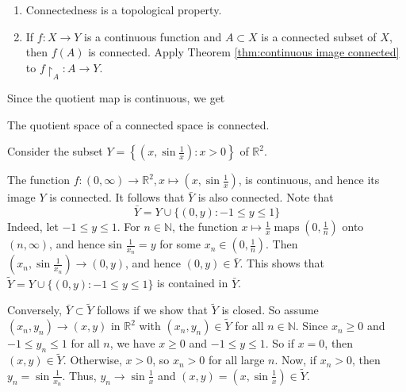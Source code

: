 \documentclass[a4paper,11pt]{article}
\begin{document}
\begin{remark}
    \begin{enumerate}
        \item Connectedness is a topological property.
      
        \item If $f: X \rightarrow Y$ is a continuous function and $A \subset X$ is a connected subset of $X$, then $f(A)$ is connected. Apply Theorem \ref{thm:continuous image connected} to $f\restriction_{A}: A \rightarrow Y$.
      \end{enumerate}
\end{remark}

Since the quotient map is continuous, we get
\begin{corollary}
    The quotient space of a connected space is connected.
\end{corollary}

\begin{example}
    Consider the subset $Y=\left\{\left(x, \sin \frac{1}{x}\right): x>0\right\}$ of $\mathbb{R}^{2}$. 
    
    The function $f:(0, \infty) \rightarrow \mathbb{R}^{2}, x \mapsto\left(x, \sin \frac{1}{x}\right)$, is continuous, and hence its image $Y$ is connected. It follows that $\bar{Y}$ is also connected. Note that
    $$
    \bar{Y}=Y \cup\{(0, y):-1 \leqslant y \leqslant 1\}
    $$
    Indeed, let $-1 \leqslant y \leqslant 1$. For $n \in \mathbb{N}$, the function $x \mapsto \frac{1}{x} \operatorname{maps}\left(0, \frac{1}{n}\right)$ onto $(n, \infty)$, and hence sin $\frac{1}{x_{n}}=y$ for some $x_{n} \in\left(0, \frac{1}{n}\right)$. Then $\left(x_{n}, \sin \frac{1}{x_{n}}\right) \rightarrow(0, y)$, and hence $(0, y) \in \bar{Y}$. This shows that $\widetilde{Y}=Y \cup\{(0, y):-1 \leqslant y \leqslant 1\}$ is contained in $\bar{Y}$. 
    
    Conversely, $\bar{Y} \subset \widetilde{Y}$ follows if we show that $\widetilde{Y}$ is closed. So assume $\left(x_{n}, y_{n}\right) \rightarrow(x, y)$ in $\mathbb{R}^{2}$ with $\left(x_{n}, y_{n}\right) \in \widetilde{Y}$ for all $n \in \mathbb{N}$. Since $x_{n} \geqslant 0$ and $-1 \leqslant y_{n} \leqslant 1$ for all $n$, we have $x \geqslant 0$ and $-1 \leqslant y \leqslant 1$. So if $x=0$, then $(x, y) \in \widetilde{Y}$. Otherwise, $x>0$, so $x_{n}>0$ for all large $n$. Now, if $x_{n}>0$, then $y_{n}=\sin \frac{1}{x_{n}}$. Thus, $y_{n} \rightarrow \sin \frac{1}{x}$ and $(x, y)=\left(x, \sin \frac{1}{x}\right) \in \widetilde{Y}$.
\end{example}
\end{document}
